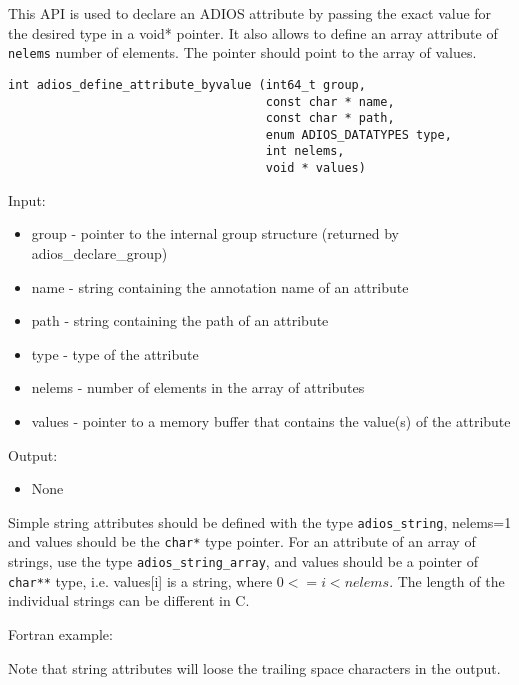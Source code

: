This API is used to declare an ADIOS attribute by passing the exact value for the desired type in a void* pointer. It also allows to define an array attribute of \verb+nelems+ number of elements. The pointer should point to the array of values. 

\begin{lstlisting}[alsolanguage=C,caption={},label={}]
int adios_define_attribute_byvalue (int64_t group,
                                    const char * name, 
                                    const char * path,
                                    enum ADIOS_DATATYPES type,
                                    int nelems,
                                    void * values)
\end{lstlisting}

Input:
\begin{itemize}
\item group - pointer to the internal group structure (returned by adios\_declare\_group)

\item name - string containing the annotation name of an attribute

\item path - string containing the path of an attribute

\item type  - type of the attribute

\item nelems - number of elements in the array of attributes 

\item values - pointer to a memory buffer that contains the value(s) of the attribute
 
\end{itemize}

Output:
\begin{itemize}
\item None
\end{itemize}

Simple string attributes should be defined with the type \verb+adios_string+, nelems=1 and values should be the \verb+char*+ type pointer. For an attribute of an array of strings, use the type \verb+adios_string_array+, and values should be a pointer of \verb+char**+ type, i.e. values[i] is a string, where $0<=i<nelems$. The length of the individual strings can be different in C.

Fortran example: 

Note that string attributes will loose the trailing space characters in the output. 

